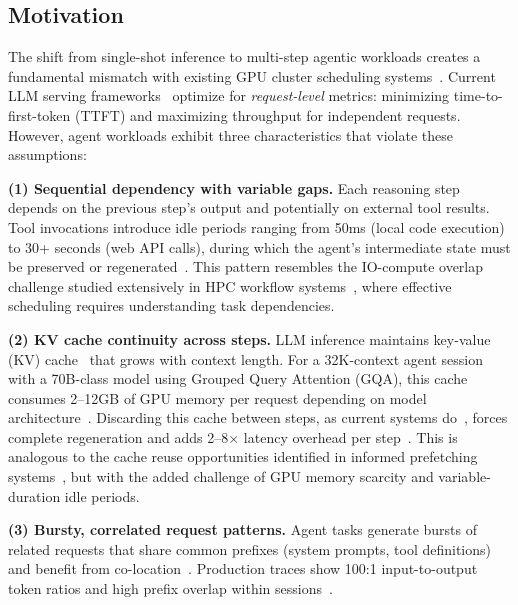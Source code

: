 \documentclass[sigconf]{acmart}
\begin{document}
\subsection{Motivation}
\label{sec:motivation}

The shift from single-shot inference to multi-step agentic workloads creates a fundamental mismatch with existing GPU cluster scheduling systems~\cite{patel2024splitwise,hu2024inference}. Current LLM serving frameworks~\cite{kwon2023vllm,zheng2024sglang,yu2022orca} optimize for \emph{request-level} metrics: minimizing time-to-first-token (TTFT) and maximizing throughput for independent requests. However, agent workloads exhibit three characteristics that violate these assumptions:

\textbf{(1) Sequential dependency with variable gaps.} Each reasoning step depends on the previous step's output and potentially on external tool results. Tool invocations introduce idle periods ranging from 50ms (local code execution) to 30+ seconds (web API calls), during which the agent's intermediate state must be preserved or regenerated~\cite{liu2024agentlimits}. This pattern resembles the IO-compute overlap challenge studied extensively in HPC workflow systems~\cite{deelman2015pegasus,thain2005condor}, where effective scheduling requires understanding task dependencies.

\textbf{(2) KV cache continuity across steps.} LLM inference maintains key-value (KV) cache~\cite{vaswani2017attention} that grows with context length. For a 32K-context agent session with a 70B-class model using Grouped Query Attention (GQA), this cache consumes 2--12GB of GPU memory per request depending on model architecture~\cite{kwon2023vllm,ainslie2023gqa}. Discarding this cache between steps, as current systems do~\cite{sheng2023flexgen}, forces complete regeneration and adds 2--8$\times$ latency overhead per step~\cite{gim2024prompt}. This is analogous to the cache reuse opportunities identified in informed prefetching systems~\cite{patterson1995prefetching}, but with the added challenge of GPU memory scarcity and variable-duration idle periods.

\textbf{(3) Bursty, correlated request patterns.} Agent tasks generate bursts of related requests that share common prefixes (system prompts, tool definitions) and benefit from co-location~\cite{jin2024ragcache}. Production traces show 100:1 input-to-output token ratios and high prefix overlap within sessions~\cite{zheng2024sglang,stojkovic2024dynamollm}.
\end{document}
